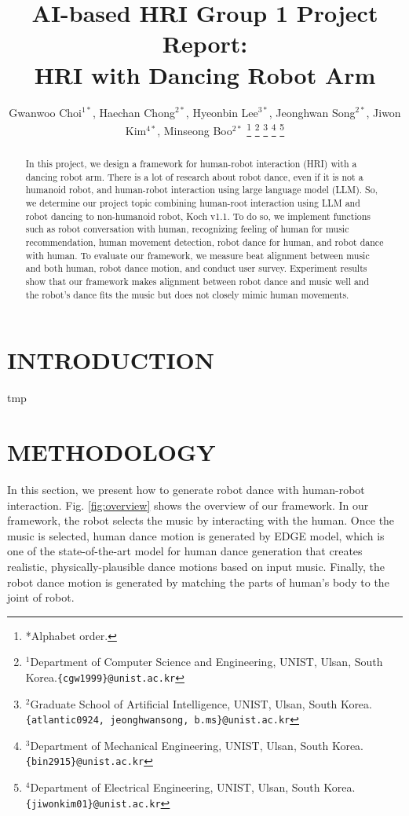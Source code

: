 \documentclass[letterpaper, 10 pt, conference]{ieeeconf}  %
\title{\LARGE \bf
AI-based HRI Group 1 Project Report: \\HRI with Dancing Robot Arm}
\author{Gwanwoo Choi$^{1*}$, Haechan Chong$^{2*}$, Hyeonbin Lee$^{3*}$, Jeonghwan Song$^{2*}$, Jiwon Kim$^{4*}$, Minseong Boo$^{2*}$ %
\thanks{*Alphabet order.}%
\thanks{$^{1}$Department of Computer Science and Engineering, UNIST, Ulsan, South
Korea.{\tt\small \{cgw1999\}@unist.ac.kr}}
\thanks{$^{2}$Graduate School of Artificial Intelligence, UNIST, Ulsan, South Korea.{\tt\small \{atlantic0924, jeonghwansong, b.ms\}@unist.ac.kr}}
\thanks{$^{3}$Department of Mechanical Engineering, UNIST, Ulsan, South
Korea. {\tt\small \{bin2915\}@unist.ac.kr}}
\thanks{$^{4}$Department of Electrical Engineering, UNIST, Ulsan, South
Korea. {\tt\small \{jiwonkim01\}@unist.ac.kr}}
}
\begin{document}
\maketitle
\thispagestyle{empty}
\pagestyle{empty}


\begin{abstract}

In this project, we design a framework for human-robot interaction (HRI) with a dancing robot arm. There is a lot of research about robot dance, even if it is not a humanoid robot, and human-robot interaction using large language model (LLM). So, we determine our project topic combining human-root interaction using LLM and robot dancing to non-humanoid robot, Koch v1.1. To do so, we implement functions such as robot conversation with human, recognizing feeling of human for music recommendation, human movement detection, robot dance for human, and robot dance with human. To evaluate our framework, we measure beat alignment between music and both human, robot dance motion, and conduct user survey. Experiment results show that our framework makes alignment between robot dance and music well and the robot's dance fits the music but does not closely mimic human movements.

\end{abstract}


\section{INTRODUCTION}

tmp

\section{METHODOLOGY}

In this section, we present how to generate robot dance with human-robot interaction. Fig. \ref{fig:overview} shows the overview of our framework. In our framework, the robot selects the music by interacting with the human. Once the music is selected, human dance motion is generated by EDGE \cite{tseng2023edge} model, which is one of the state-of-the-art model for human dance generation that creates realistic, physically-plausible dance motions based on input music. Finally, the robot dance motion is generated by matching the parts of human's body to the joint of robot.
\end{document}
